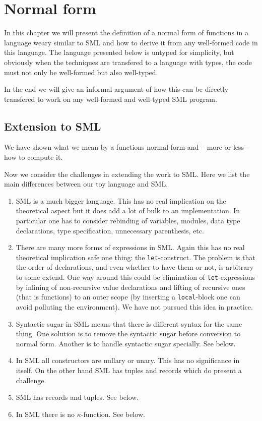 \chapter{Normal form}

In this chapter we will present the definition of a normal form of functions in
a language weary similar to SML and how to derive it from any well-formed code
in this language. The language presented below is untyped for simplicity, but
obviously when the techniques are transfered to a language with types, the code
must not only be well-formed but also well-typed.

In the end we will give an informal argument of how this can be directly
transfered to work on any well-formed and well-typed SML program.



\section{Extension to SML}

We have shown what we mean by a functions normal form and -- more or less -- how
to compute it.

Now we consider the challenges in extending the work to SML. Here we list the
main differences between our toy language and SML.

\begin{enumerate}
\item SML is a much bigger language. This has no real implication on the
  theoretical aspect but it does add a lot of bulk to an implementation. In
  particular one has to consider rebinding of variables, modules, data type
  declarations, type specification, unnecessary parenthesis, etc.
\item There are many more forms of expressions in SML. Again this has no real
  theoretical implication safe one thing: the \texttt{let}-construct. The
  problem is that the order of declarations, and even whether to have them or
  not, is arbitrary to some extend. One way around this could be elimination of
  \texttt{let}-expressions by inlining of non-recursive value declarations and
  lifting of recursive ones (that is functions) to an outer scope (by inserting
  a \texttt{local}-block one can avoid polluting the environment). We have not
  pursued this idea in practice.
\item Syntactic sugar in SML means that there is different syntax for the same
  thing. One solution is to remove the syntactic sugar before conversion to
  normal form. Another is to handle syntactic sugar specially. See
   below.
\item In SML all constructors are nullary or unary. This has no significance in
  itself. On the other hand SML has tuples and records which do present a
  challenge.
\item SML has records and tuples. See  below.
\item In SML there is no $\kappa$-function. See 
  below.
\end{enumerate}

